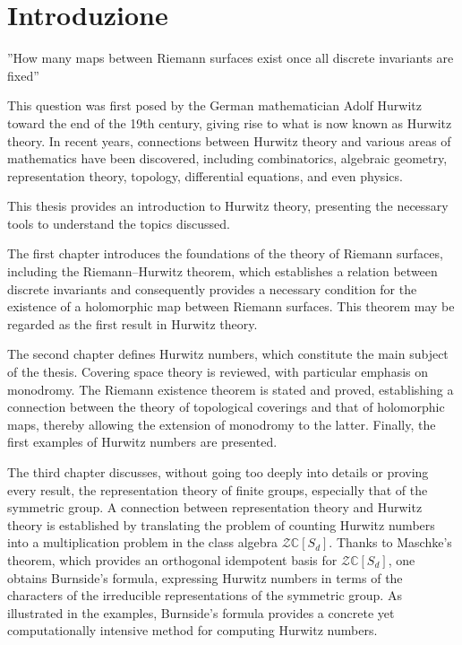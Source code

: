 \documentclass[12pt,a4paper,openright,twoside]{report}
\theoremstyle{definition} %
\def \C {\mathbb{C}}
\def \ZZ {\mathcal{Z}}
\begin{document}
\chapter*{Introduzione}
	\captionsetup[figure]{width=0.7\linewidth,labelfont=bf,textfont=it}


    ''How many maps between Riemann surfaces exist once all discrete invariants are fixed''

    This question was first posed by the German mathematician Adolf Hurwitz toward the end of the 19th century, giving rise to what is now known as Hurwitz theory.
    In recent years, connections between Hurwitz theory and various areas of mathematics have been discovered, including combinatorics, algebraic geometry, representation theory, topology, differential equations, and even physics.
    
    This thesis provides an introduction to Hurwitz theory, presenting the necessary tools to understand the topics discussed.
    
    The first chapter introduces the foundations of the theory of Riemann surfaces, including the Riemann–Hurwitz theorem, which establishes a relation between discrete invariants and consequently provides a necessary condition for the existence of a holomorphic map between Riemann surfaces. This theorem may be regarded as the first result in Hurwitz theory.
    
    The second chapter defines Hurwitz numbers, which constitute the main subject of the thesis. Covering space theory is reviewed, with particular emphasis on monodromy. The Riemann existence theorem is stated and proved, establishing a connection between the theory of topological coverings and that of holomorphic maps, thereby allowing the extension of monodromy to the latter. Finally, the first examples of Hurwitz numbers are presented.
    
    The third chapter discusses, without going too deeply into details or proving every result, the representation theory of finite groups, especially that of the symmetric group. A connection between representation theory and Hurwitz theory is established by translating the problem of counting Hurwitz numbers into a multiplication problem in the class algebra \(\ZZ \C[S_d]\). Thanks to Maschke's theorem, which provides an orthogonal idempotent basis for \(\ZZ \C[S_d]\), one obtains Burnside’s formula, expressing Hurwitz numbers in terms of the characters of the irreducible representations of the symmetric group. As illustrated in the examples, Burnside’s formula provides a concrete yet computationally intensive method for computing Hurwitz numbers.
    
\end{document}
